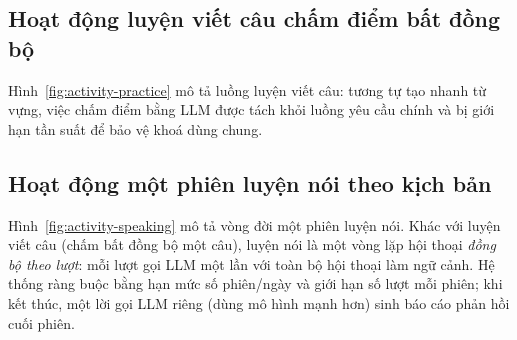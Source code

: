 
\subsection{Hoạt động luyện viết câu chấm điểm bất đồng bộ}
\label{subsec:activity-practice}

Hình~\ref{fig:activity-practice} mô tả luồng luyện viết câu: tương tự tạo
nhanh từ vựng, việc chấm điểm bằng LLM được tách khỏi luồng yêu cầu chính
và bị giới hạn tần suất để bảo vệ khoá dùng chung.


\subsection{Hoạt động một phiên luyện nói theo kịch bản}
\label{subsec:activity-speaking}

Hình~\ref{fig:activity-speaking} mô tả vòng đời một phiên luyện nói. Khác với
luyện viết câu (chấm bất đồng bộ một câu), luyện nói là một vòng lặp hội thoại
\textit{đồng bộ theo lượt}: mỗi lượt gọi LLM một lần với toàn bộ hội thoại làm
ngữ cảnh. Hệ thống ràng buộc bằng hạn mức số phiên/ngày và giới hạn số lượt mỗi
phiên; khi kết thúc, một lời gọi LLM riêng (dùng mô hình mạnh hơn) sinh báo cáo
phản hồi cuối phiên.

